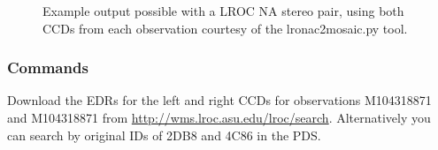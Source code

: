 \begin{figure}[h!]
\centering
  \hfil
\caption{Example output possible with a LROC NA stereo pair, using both CCDs from each observation courtesy of the lronac2mosaic.py tool.}
\label{fig:lroc-na-example}
\end{figure}

\subsubsection*{Commands}

Download the EDRs for the left and right CCDs for observations
M104318871 and M104318871 from \url{http://wms.lroc.asu.edu/lroc/search}.
Alternatively you can search by original
IDs of 2DB8 and 4C86 in the PDS.

